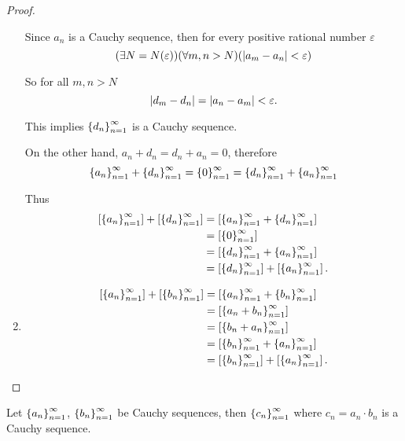 \begin{proof}
\begin{enumerate}[label={(F\arabic*)},itemsep=0pt]
              Since $a_{n}$ is a Cauchy sequence, then for every positive rational number $\varepsilon$
              \[
                  (\exists N=N(\varepsilon))(\forall m, n > N)(\left\vert{a_{m} - a_{n}}\right\vert < \varepsilon)
              \]

              So for all $m, n > N$
              \[
                  \left\vert{d_{m} - d_{n}}\right\vert = \left\vert{a_{n} - a_{m}}\right\vert < \varepsilon.
              \]

              This implies ${\left\{{d_{n}}\right\}}^{\infty}_{n=1}$ is a Cauchy sequence.

              On the other hand, $a_{n} + d_{n} = d_{n} + a_{n} = 0$, therefore
              \[
                  {\left\{{a_{n}}\right\}}^{\infty}_{n=1} + {\left\{{d_{n}}\right\}}^{\infty}_{n=1} = {\left\{{0}\right\}}^{\infty}_{n=1} = {\left\{{d_{n}}\right\}}^{\infty}_{n=1} + {\left\{{a_{n}}\right\}}^{\infty}_{n=1}
              \]

              Thus
              \begin{align*}
                  \left[{{\left\{{a_{n}}\right\}}^{\infty}_{n=1}}\right] + \left[{{\left\{{d_{n}}\right\}}^{\infty}_{n=1}}\right] & = \left[{{\left\{{a_{n}}\right\}}^{\infty}_{n=1} + {\left\{{d_{n}}\right\}}^{\infty}_{n=1}}\right]          \\
                                                            & = \left[{{\left\{{0}\right\}}^{\infty}_{n=1}}\right]                            \\
                                                            & = \left[{{\left\{{d_{n}}\right\}}^{\infty}_{n=1} + {\left\{{a_{n}}\right\}}^{\infty}_{n=1}}\right]          \\
                                                            & = \left[{{\left\{{d_{n}}\right\}}^{\infty}_{n=1}}\right] + \left[{{\left\{{a_{n}}\right\}}^{\infty}_{n=1}}\right].
              \end{align*}
        \item \begin{align*}
                  \left[{{\left\{{a_{n}}\right\}}^{\infty}_{n=1}}\right] + \left[{{\left\{{b_{n}}\right\}}^{\infty}_{n=1}}\right] & = \left[{{\left\{{a_{n}}\right\}}^{\infty}_{n=1} + {\left\{{b_{n}}\right\}}^{\infty}_{n=1}}\right]                  \\
                                                            & = \left[{{\left\{{a_{n} + b_{n}}\right\}}^{\infty}_{n=1}}\right]                        \\
                                                            & = \left[{{\left\{{b_{n} + a_{n}}\right\}}^{\infty}_{n=1}}\right]                        \\
                                                            & = \left[{{\left\{{b_{n}}\right\}}^{\infty}_{n=1} + {\left\{{a_{n}}\right\}}^{\infty}_{n=1}}\right]                  \\
                                                            & = \left[{{\left\{{b_{n}}\right\}}^{\infty}_{n=1}}\right] + \left[{{\left\{{a_{n}}\right\}}^{\infty}_{n=1}}\right].\qedhere
              \end{align*}
    \end{enumerate}
\end{proof}

\begin{theorem}\label{theorem:chapter1:product-of-cauchy-sequences}
    Let ${\left\{{a_{n}}\right\}}^{\infty}_{n=1}$, ${\left\{{b_{n}}\right\}}^{\infty}_{n=1}$ be Cauchy sequences, then ${\left\{{c_{n}}\right\}}^{\infty}_{n=1}$ where $c_{n} = a_{n} \cdot b_{n}$ is a Cauchy sequence.
\end{theorem}

